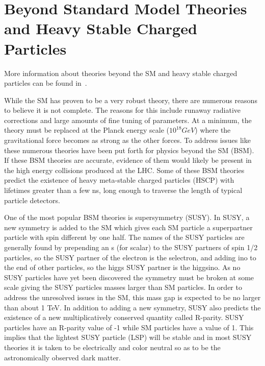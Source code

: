 \section{Beyond Standard Model Theories and Heavy Stable Charged Particles \label{sec:BSM}}
More information about theories beyond the SM and heavy stable charged particles can be found in~\cite{Fairbairn:2006gg, Martin:1997ns, Tata:1997uf}.

While the SM has proven to be a very robust theory, there are numerous reasons to believe it is not complete. The reasons for this include runaway
radiative corrections and large amounts of fine tuning of parameters. At a minimum, the theory must be replaced at the Planck energy scale ($10^{18} GeV$)
where the gravitational force becomes as strong as the other forces. To address issues like these numerous
theories have been put forth for physics beyond the SM (BSM). 
If these BSM theories are accurate, evidence of them would likely be present in the high energy collisions produced at the LHC.
Some of these BSM theories predict the existence of heavy meta-stable
charged particles (HSCP) with lifetimes greater than a few ns, long enough to traverse the length of typical particle detectors. 

One of the most popular BSM theories is supersymmetry (SUSY). In SUSY, a new symmetry is added to the SM which gives
each SM particle a superpartner particle with spin different by one half. 
The names of the SUSY particles are generally found by prepending an s (for scalar) to the SUSY partners of spin 1/2 particles,
so the SUSY partner of the electron is the selectron, and adding ino to the end of other particles, so the higgs SUSY partner is the higgsino.
As no SUSY particles have yet been discovered the
symmetry must be broken at some scale giving the SUSY particles masses larger than SM particles. In order to address the unresolved issues in the SM, this mass gap is
expected to be no larger than about 1 TeV. In addition to adding a new symmetry, SUSY also predicts the existence of a new multiplicatively conserved quantity called R-parity.
SUSY particles have an R-parity value of -1 while SM particles have a value of 1. This implies that the lightest SUSY particle (LSP) will be stable and in most
SUSY theories it is taken to be electrically and color neutral so as to be the astronomically observed dark matter.


